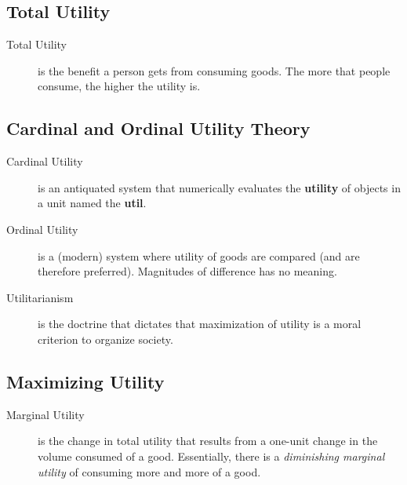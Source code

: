                 \subsection{Total Utility} %
                \label{sub:total_utility}
                    \begin{description}
                        \item[Total Utility] is the benefit a person gets from consuming goods.
                            The more that people consume, the higher the utility is.
                    \end{description}

                \subsection{Cardinal and Ordinal Utility Theory} %
                \label{sub:cardinal_and_ordinal_utility_theory}
                    \begin{description}
                        \item[Cardinal Utility] is an antiquated system that numerically evaluates the \textbf{utility} of objects in a unit named the \textbf{util}.
                        \item[Ordinal Utility] is a (modern) system where utility of goods are compared (and are therefore preferred).
                            Magnitudes of difference has no meaning.
                        \item[Utilitarianism] is the doctrine that dictates that maximization of utility is a moral criterion to organize society.
                    \end{description}
                \subsection{Maximizing Utility} %
                \label{sub:maximizing_utility}
                    \begin{description}
                        \item[Marginal Utility] is the change in total utility that results from a one-unit change in the volume consumed of a good.
                            Essentially, there is a \emph{diminishing marginal utility} of consuming more and more of a good.
                    \end{description}
